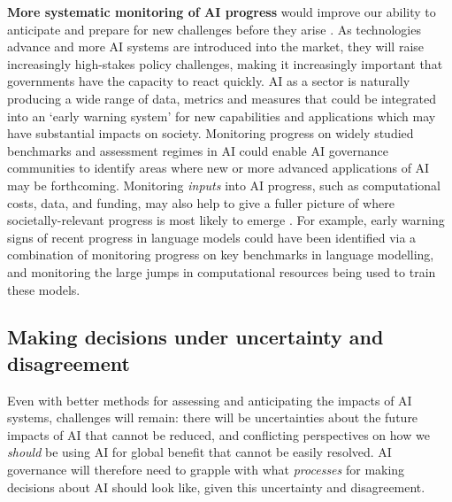 \documentclass{article}
\begin{document}
\textbf{More systematic monitoring of AI progress} would improve our ability to anticipate and prepare for new challenges before they arise \citep{whittlestone_societal_2021}. As technologies advance and more AI systems are introduced into the market, they will raise increasingly high-stakes policy challenges, making it increasingly important that governments have the capacity to react quickly. AI as a sector is naturally producing a wide range of data, metrics and measures that could be integrated into an ‘early warning system’ for new capabilities and applications which may have substantial impacts on society. Monitoring progress on widely studied benchmarks and assessment regimes in AI could enable AI governance communities to identify areas where new or more advanced applications of AI may be forthcoming. Monitoring \emph{inputs} into AI progress, such as computational costs, data, and funding, may also help to give a fuller picture of where societally-relevant progress is most likely to emerge \citep{martinez-plumed_accounting_2018}. For example, early warning signs of recent progress in language models could have been identified via a combination of monitoring progress on key benchmarks in language modelling, and monitoring the large jumps in computational resources being used to train these models.

\subsection{Making decisions under uncertainty and disagreement}

Even with better methods for assessing and anticipating the impacts of AI systems, challenges will remain: there will be uncertainties about the future impacts of AI that cannot be reduced, and conflicting perspectives on how we \textit{should }be using AI for global benefit that cannot be easily resolved. AI governance will therefore need to grapple with what \textit{processes} for making decisions about AI should look like, given this uncertainty and disagreement.
\end{document}
